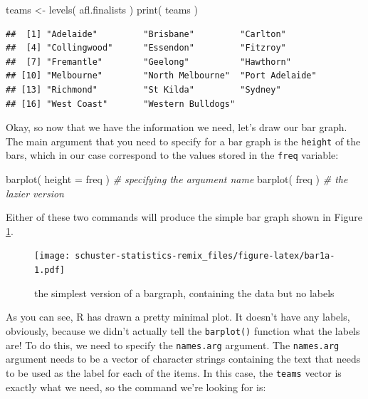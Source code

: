 \documentclass[
]{book}
\newenvironment{Shaded}{\begin{snugshade}}{\end{snugshade}}
\newcommand{\AttributeTok}[1]{\textcolor[rgb]{0.77,0.63,0.00}{#1}}
\newcommand{\CommentTok}[1]{\textcolor[rgb]{0.56,0.35,0.01}{\textit{#1}}}
\newcommand{\FunctionTok}[1]{\textcolor[rgb]{0.00,0.00,0.00}{#1}}
\newcommand{\NormalTok}[1]{#1}
\newcommand{\OtherTok}[1]{\textcolor[rgb]{0.56,0.35,0.01}{#1}}
\begin{document}
\begin{Shaded}
\begin{Highlighting}[]
\NormalTok{teams }\OtherTok{\textless{}{-}} \FunctionTok{levels}\NormalTok{( afl.finalists )}
\FunctionTok{print}\NormalTok{( teams )}
\end{Highlighting}
\end{Shaded}

\begin{verbatim}
##  [1] "Adelaide"         "Brisbane"         "Carlton"         
##  [4] "Collingwood"      "Essendon"         "Fitzroy"         
##  [7] "Fremantle"        "Geelong"          "Hawthorn"        
## [10] "Melbourne"        "North Melbourne"  "Port Adelaide"   
## [13] "Richmond"         "St Kilda"         "Sydney"          
## [16] "West Coast"       "Western Bulldogs"
\end{verbatim}

Okay, so now that we have the information we need, let's draw our bar graph. The main argument that you need to specify for a bar graph is the \texttt{height} of the bars, which in our case correspond to the values stored in the \texttt{freq} variable:

\begin{Shaded}
\begin{Highlighting}[]
\FunctionTok{barplot}\NormalTok{( }\AttributeTok{height =}\NormalTok{ freq )  }\CommentTok{\# specifying the argument name}
\FunctionTok{barplot}\NormalTok{( freq )           }\CommentTok{\# the lazier version}
\end{Highlighting}
\end{Shaded}

Either of these two commands will produce the simple bar graph shown in Figure \ref{fig:bar1a}.

\begin{figure}
\centering
\texttt{[image: schuster-statistics-remix\_files/figure-latex/bar1a-1.pdf]}
\caption{\label{fig:bar1a}the simplest version of a bargraph, containing the data but no labels}
\end{figure}

As you can see, R has drawn a pretty minimal plot. It doesn't have any labels, obviously, because we didn't actually tell the \texttt{barplot()} function what the labels are! To do this, we need to specify the \texttt{names.arg} argument. The \texttt{names.arg} argument needs to be a vector of character strings containing the text that needs to be used as the label for each of the items. In this case, the \texttt{teams} vector is exactly what we need, so the command we're looking for is:
\end{document}
